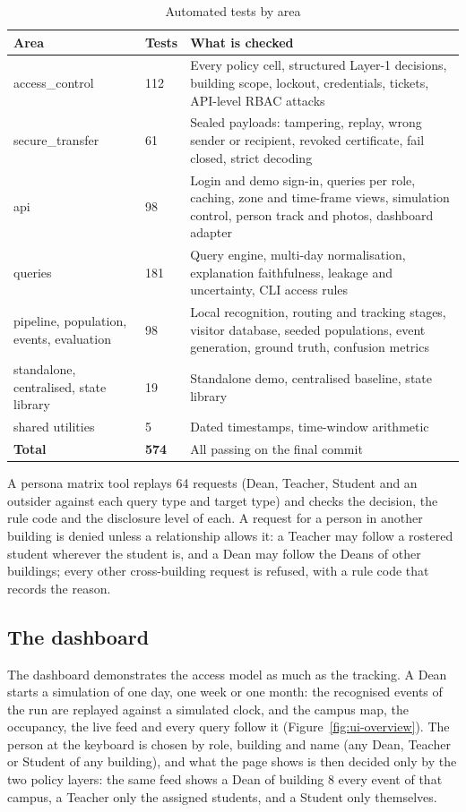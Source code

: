 \documentclass[12pt,a4paper,oneside]{report}
\begin{document}
\begin{table}[htbp]
\centering
\caption{Automated tests by area}\label{tab:tests}
{\small\setlength{\tabcolsep}{4pt}\renewcommand{\arraystretch}{1.2}
\begin{tabular}{|p{4.50cm}|p{1.37cm}|p{8.41cm}|}\hline
\textbf{Area} & \textbf{Tests} & \textbf{What is checked}\\\hline
access\_\allowbreak control & 112 & Every policy cell, structured Layer-1 decisions, building scope, lockout, credentials, tickets, API-level RBAC attacks\\\hline
secure\_\allowbreak transfer & 61 & Sealed payloads: tampering, replay, wrong sender or recipient, revoked certificate, fail closed, strict decoding\\\hline
api & 98 & Login and demo sign-in, queries per role, caching, zone and time-frame views, simulation control, person track and photos, dashboard adapter\\\hline
queries & 181 & Query engine, multi-day normalisation, explanation faithfulness, leakage and uncertainty, CLI access rules\\\hline
pipeline, population, events, evaluation & 98 & Local recognition, routing and tracking stages, visitor database, seeded populations, event generation, ground truth, confusion metrics\\\hline
standalone, centralised, state library & 19 & Standalone demo, centralised baseline, state library\\\hline
shared utilities & 5 & Dated timestamps, time-window arithmetic\\\hline
\textbf{Total} & \textbf{574} & All passing on the final commit\\\hline
\end{tabular}}
\end{table}

A persona matrix tool replays 64 requests (Dean, Teacher, Student and an outsider against each query type and target type) and checks the decision, the rule code and the disclosure level of each. A request for a person in another building is denied unless a relationship allows it: a Teacher may follow a rostered student wherever the student is, and a Dean may follow the Deans of other buildings; every other cross-building request is refused, with a rule code that records the reason.



\subsection{The dashboard}\label{sec:res-ui}
The dashboard demonstrates the access model as much as the tracking. A Dean starts a simulation of one day, one week or one month: the recognised events of the run are replayed against a simulated clock, and the campus map, the occupancy, the live feed and every query follow it (Figure~\ref{fig:ui-overview}). The person at the keyboard is chosen by role, building and name (any Dean, Teacher or Student of any building), and what the page shows is then decided only by the two policy layers: the same feed shows a Dean of building 8 every event of that campus, a Teacher only the assigned students, and a Student only themselves.
\end{document}
